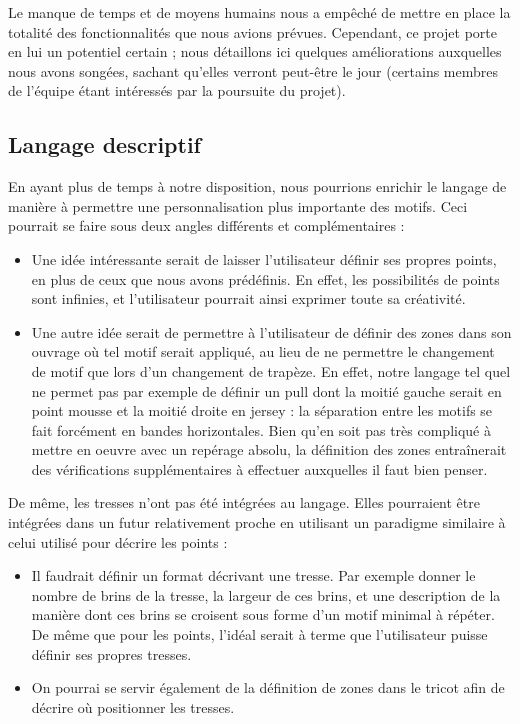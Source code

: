 \documentclass{article}
\begin{document}
Le manque de temps et de moyens humains nous a empêché de mettre en
place la totalité des fonctionnalités que nous avions prévues. Cependant, 
ce projet porte en lui un potentiel certain ; nous détaillons
ici quelques améliorations auxquelles nous avons songées, sachant qu'elles verront
peut-être le jour (certains membres de l'équipe étant intéressés par la 
poursuite du projet).

\subsection{Langage descriptif}

En ayant plus de temps à notre disposition, nous pourrions enrichir le langage de manière à permettre une personnalisation plus importante des motifs. 
Ceci pourrait se faire sous deux angles différents et complémentaires :
\begin{itemize}
 \item Une idée intéressante serait de laisser l'utilisateur définir ses propres points, en plus de ceux que nous avons prédéfinis. En effet, les possibilités de points sont infinies, et l'utilisateur pourrait ainsi exprimer toute sa créativité.
 \item Une autre idée serait de permettre à l'utilisateur de définir des zones dans son ouvrage où tel motif serait appliqué, au lieu de ne permettre le changement de motif que lors d'un changement de trapèze. En effet, notre langage tel quel ne permet pas par exemple de définir un pull dont la moitié gauche serait en point mousse et la moitié droite en jersey : la séparation entre les motifs se fait forcément en bandes horizontales. Bien qu'en soit pas très compliqué à mettre en oeuvre avec un repérage absolu, la définition des zones entraînerait des vérifications supplémentaires à effectuer auxquelles il faut bien penser.\\
\end{itemize}

De même, les tresses n'ont pas été intégrées au langage. Elles pourraient être intégrées dans un futur relativement proche en utilisant un paradigme similaire à celui utilisé pour décrire les points :
\begin{itemize}
 \item Il faudrait définir un format décrivant une tresse. Par exemple donner le nombre de brins de la tresse, la largeur de ces brins, et une description de la manière dont ces brins se croisent sous forme d'un motif minimal à répéter. De même que pour les points, l'idéal serait à terme que l'utilisateur puisse définir ses propres tresses.
 \item On pourrai se servir également de la définition de zones dans le tricot afin de décrire où positionner les tresses. \\
\end{itemize}
\end{document}
